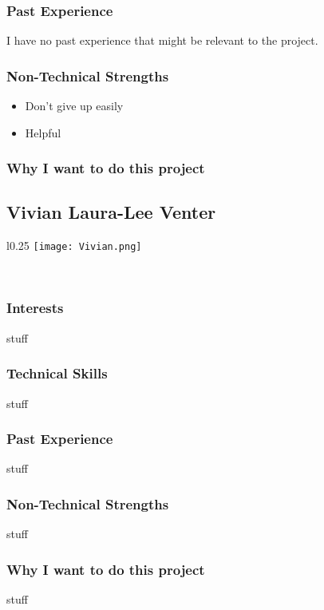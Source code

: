 \subsubsection{Past Experience}
I have no past experience that might be relevant to the project. %
\subsubsection{Non-Technical Strengths}
	\begin{itemize}
		\item Don't give up easily
		\item Helpful
	\end{itemize}
\subsubsection{Why I want to do this project} 


\subsection{Vivian Laura-Lee Venter}
\begin{wrapfigure}[7]{l}{0.25\textwidth}
\vspace{10pt}
\texttt{[image: Vivian.png]}
\end{wrapfigure}

\textcolor{white}{.}
\subsubsection{Interests} stuff
\subsubsection{Technical Skills} stuff
\subsubsection{Past Experience} stuff
\subsubsection{Non-Technical Strengths} stuff
\subsubsection{Why I want to do this project} stuff
